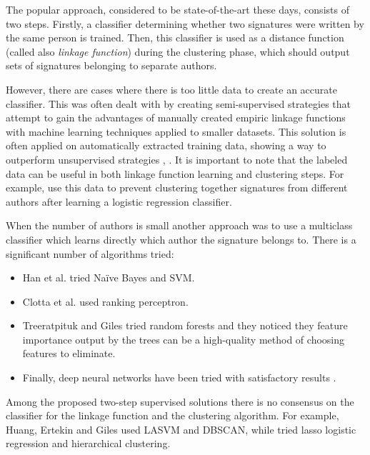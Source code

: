 \documentclass{pracamgr}
\begin{document}
The popular approach, considered to be state-of-the-art these days, consists of two steps. 
Firstly, a classifier determining whether two signatures were written by the same person is 
trained. Then, this classifier is used as a distance function (called also \textit{linkage 
function}) during the clustering phase, which should output sets of signatures belonging to 
separate authors.

However, there are cases where there is too little data to create an accurate classifier. This was 
often dealt with by creating semi-supervised strategies that attempt to gain the advantages of 
manually created empiric linkage functions with machine learning techniques applied to smaller 
datasets. This solution is often applied on automatically
extracted training data, showing a way to outperform unsupervised strategies 
\citep{ferreira2010effective}, \citep{torvik2009author}. It is important to note that the
labeled data can be useful in both linkage function learning and clustering steps.
For example, \citep{levin2012citation} use this data to prevent clustering together signatures
from different authors after learning a logistic regression classifier.

When the number of authors is small another approach was to use a multiclass classifier
which learns directly which author the signature belongs to. There is a significant number
of algorithms tried:

\begin{itemize}

\item{Han et al. \citep{han2004two} tried Na\"{i}ve Bayes and SVM.}
\item{Clotta et al. \citep{culotta2007author} used ranking perceptron.}
\item{Treeratpituk and Giles \citep{treeratpituk2009disambiguating} tried random forests
and they noticed they feature importance output by the trees \citep{louppe2013understanding}
can be a high-quality method of choosing features to eliminate.}
\item{Finally, deep neural networks have been tried with satisfactory results
\citep{tran2014author}.}

\end{itemize}

Among the proposed two-step supervised solutions there is no consensus on the classifier for 
the linkage function and the clustering algorithm. For example, Huang, Ertekin and Giles
\citep{huang2006efficient} used LASVM and DBSCAN, while \citep{levin2012citation} tried lasso logistic regression
and hierarchical clustering.
\end{document}
